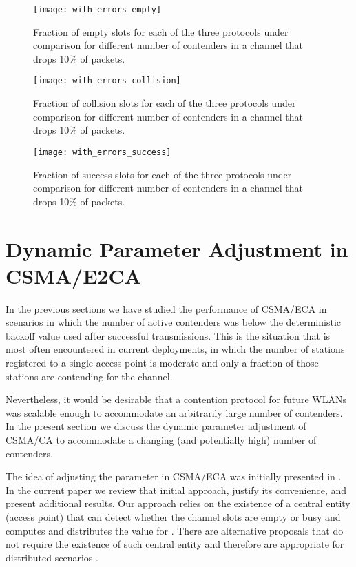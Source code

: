 \documentclass[journal]{IEEEtran}
\begin{document}
\begin{figure}[!t]
\centering
\texttt{[image: with\_errors\_empty]}
\caption{Fraction of empty slots for each of the three protocols under comparison for different number of contenders in a channel that drops 10\% of packets.}
\label{fig:with_errors_empty}
\end{figure}

\begin{figure}[!t]
\centering
\texttt{[image: with\_errors\_collision]}
\caption{Fraction of collision slots for each of the three protocols under comparison for different number of contenders in a channel that drops 10\% of packets.}
\label{fig:with_errors_collision}
\end{figure}


\begin{figure}[!t]
\centering
\texttt{[image: with\_errors\_success]}
\caption{Fraction of success slots for each of the three protocols under comparison for different number of contenders in a channel that drops 10\% of packets.}
\label{fig:with_errors_success}
\end{figure}

\section{Dynamic Parameter Adjustment in CSMA/E2CA}
\label{sec:dpa}
In the previous sections we have studied the performance of CSMA/ECA in scenarios in which the number of active contenders was below the deterministic backoff value used after successful transmissions. This is the situation that is most often encountered in current deployments, in which the number of stations registered to a single access point is moderate and only a fraction of those stations are contending for the channel.

Nevertheless, it would be desirable that a contention protocol for future WLANs was scalable enough to accommodate an arbitrarily large number of contenders. In the present section we discuss the dynamic parameter adjustment of CSMA/CA to accommodate a changing (and potentially high) number of contenders.

The idea of adjusting the  parameter in CSMA/ECA was initially presented in \cite{barcelo2010dpa}. In the current paper we review that initial approach, justify its convenience, and present additional results. Our approach relies on the existence of a central entity (access point) that can detect whether the channel slots are empty or busy and computes and distributes the value for . There are alternative proposals that do not require the existence of such central entity and therefore are appropriate for distributed scenarios \cite{fang2009dlm}.
\end{document}
